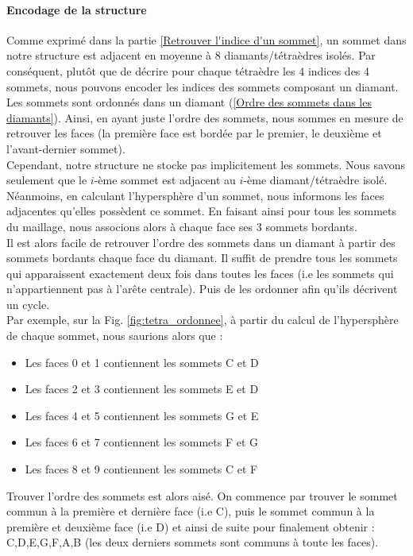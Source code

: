 \paragraph{Encodage de la structure}
Comme exprimé dans la partie \ref{Retrouver l'indice d'un sommet}, un sommet dans notre structure est adjacent en moyenne à 8 diamants/tétraèdres isolés. Par conséquent, plutôt que de décrire pour chaque tétraèdre les 4 indices des 4 sommets, nous pouvons encoder les indices des sommets composant un diamant. Les sommets sont ordonnés dans un diamant (\ref{Ordre des sommets dans les diamants}). Ainsi, en ayant juste l'ordre des sommets, nous sommes en mesure de retrouver les faces (la première face est bordée par le premier, le deuxième et l'avant-dernier sommet).\\
Cependant, notre structure ne stocke pas implicitement les sommets. Nous savons seulement que le $i$-ème sommet est adjacent au $i$-ème diamant/tétraèdre isolé. Néanmoins, en calculant l'hypersphère d'un sommet, nous informons les faces adjacentes qu'elles possèdent ce sommet. En faisant ainsi pour tous les sommets du maillage, nous associons alors à chaque face ses 3 sommets bordants.\\
Il est alors facile de retrouver l'ordre des sommets dans un diamant à partir des sommets bordants chaque face du diamant. Il suffit de prendre tous les sommets qui apparaissent exactement deux fois dans toutes les faces (i.e les sommets qui n'appartiennent pas à l'arête centrale). Puis de les ordonner afin qu'ils décrivent un cycle.\\
Par exemple, sur la Fig. \ref{fig:tetra_ordonnee}, à partir du calcul de l'hypersphère de chaque sommet, nous saurions alors que :
\begin{itemize}
\item Les faces 0 et 1 contiennent les sommets C et D
\item Les faces 2 et 3 contiennent les sommets E et D
\item Les faces 4 et 5 contiennent les sommets G et E
\item Les faces 6 et 7 contiennent les sommets F et G
\item Les faces 8 et 9 contiennent les sommets C et F\\
\end{itemize}
Trouver l'ordre des sommets est alors aisé. On commence par trouver le sommet commun à la première et dernière face (i.e C), puis le sommet commun à la première et deuxième face (i.e D) et ainsi de suite pour finalement obtenir : C,D,E,G,F,A,B (les deux derniers sommets sont communs à toute les faces).


